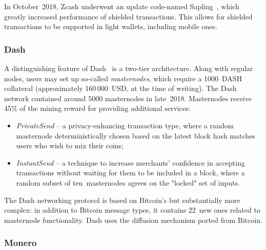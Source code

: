 In October~2018, Zcash underwent an update code-named Sapling~\cite{Zcash2018}, which greatly increased performance of shielded transactions.
This allows for shielded transactions to be supported in light wallets, including mobile ones.


\subsubsection{Dash}

A distinguishing feature of Dash~\cite{Dash} is a two-tier architecture.
Along with regular nodes, users may set up so-called \textit{masternodes}, which require a 1000~DASH collateral (approximately 160\,000~USD, at the time of writing).
The Dash network contained around 5000 masternodes in late~2018.
Masternodes receive 45\% of the mining reward for providing additional services:
\begin{itemize}
	\item \textit{PrivateSend} -- a privacy-enhancing transaction type, where a random masternode deterministically chosen based on the latest block hash matches users who wish to mix their coins;
	\item \textit{InstantSend} -- a technique to increase merchants' confidence in accepting transactions without waiting for them to be included in a block, where a random subset of ten~masternodes agrees on the "locked" set of inputs.
\end{itemize}

The Dash networking protocol is based on Bitcoin's but substantially more complex: in addition to Bitcoin message types, it contains 22~new ones related to masternode functionality.
Dash uses the diffusion mechanism ported from Bitcoin.


\subsubsection{Monero}


